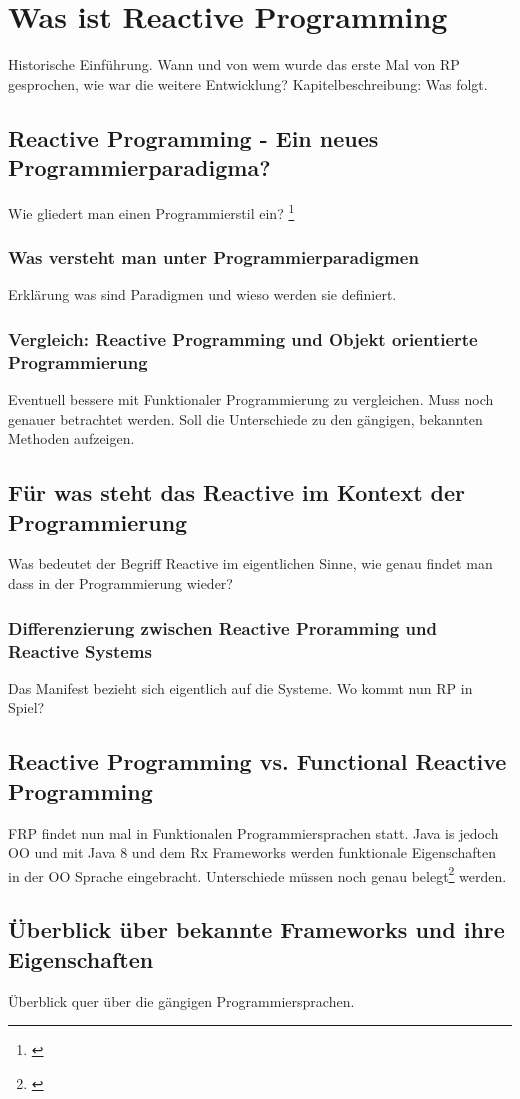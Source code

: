 \chapter{Was ist Reactive Programming}\label{was_ist_reactive_programming}
Historische Einführung. Wann und von wem wurde das erste Mal von RP gesprochen, wie war die weitere Entwicklung?
Kapitelbeschreibung: Was folgt. 
\section{Reactive Programming - Ein neues Programmierparadigma?}
Wie gliedert man einen Programmierstil ein? \footnote{\cite{Bainomugisha.2013}}
\subsection{Was versteht man unter Programmierparadigmen}
 Erklärung was sind Paradigmen und wieso werden sie definiert.
\subsection{Vergleich: Reactive Programming und Objekt orientierte Programmierung}
Eventuell bessere mit Funktionaler Programmierung zu vergleichen. Muss noch genauer betrachtet werden. Soll die Unterschiede zu den gängigen, bekannten Methoden aufzeigen.
\section{Für was steht das Reactive im Kontext der Programmierung}
Was bedeutet der Begriff Reactive im eigentlichen Sinne, wie genau findet man dass in der Programmierung wieder?
\subsection{Differenzierung zwischen Reactive Proramming und Reactive Systems}
Das Manifest bezieht sich eigentlich auf die Systeme. Wo kommt nun RP in Spiel? 
\section{Reactive Programming vs. Functional Reactive Programming}
FRP findet nun mal in Funktionalen Programmiersprachen statt. Java is jedoch OO und mit Java 8 und dem Rx Frameworks werden funktionale Eigenschaften in der OO Sprache eingebracht. Unterschiede müssen noch genau belegt\footnote{\cite{Lohmuller.2016}} werden.
\section{Überblick über bekannte Frameworks und ihre Eigenschaften}
Überblick quer über die gängigen Programmiersprachen. 
